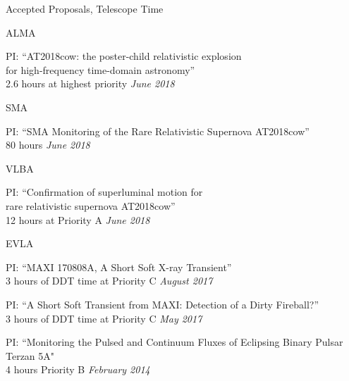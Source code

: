 \documentclass{resume} %
\begin{document}

\begin{rSection}{Accepted Proposals, Telescope Time}

\begin{rSubsection}{ALMA}{}{}{}
\item PI: ``AT2018cow: the poster-child relativistic explosion \\
  for high-frequency time-domain astronomy'' \\
  2.6 hours at highest priority \hfill {\em June 2018}
\end{rSubsection}

\begin{rSubsection}{SMA}{}{}{}
\item PI: ``SMA Monitoring of the Rare Relativistic Supernova AT2018cow'' \\
  80 hours \hfill {\em June 2018}
\end{rSubsection}

\begin{rSubsection}{VLBA}{}{}{}
\item PI: ``Confirmation of superluminal motion for \\
  rare relativistic supernova AT2018cow''\\
  12 hours at Priority A \hfill {\em June 2018}
\end{rSubsection}

\begin{rSubsection}{EVLA}{}{}{}
\item PI: ``MAXI 170808A, A Short Soft X-ray Transient'' \\
  3 hours of DDT time at Priority C \hfill {\em August 2017}
\item PI: ``A Short Soft Transient from MAXI: Detection of a Dirty Fireball?'' \\
  3 hours of DDT time at Priority C \hfill {\em May 2017}
\item PI: ``Monitoring the Pulsed and Continuum Fluxes of Eclipsing Binary Pulsar Terzan 5A" \\
4 hours Priority B \hfill {\em February 2014}
\end{rSubsection}

\end{rSection}

\end{document}
